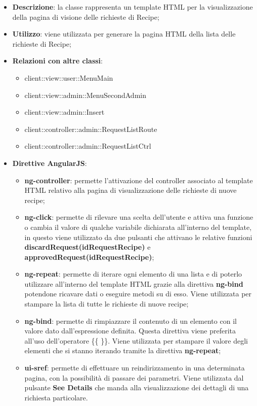 			\begin{itemize}
				\item \textbf{Descrizione}: la classe rappresenta un template HTML per la visualizzazione della pagina di visione delle richieste di Recipe;
				\item \textbf{Utilizzo}: viene utilizzata per generare la pagina HTML della lista delle richieste di Recipe;
				\item \textbf{Relazioni con altre classi}:
					\begin{itemize}
						\item client::view::user::MenuMain
						\item client::view::admin::MenuSecondAdmin
						\item client::view::admin::Insert
						\item client::controller::admin::RequestListRoute
						\item client::controller::admin::RequestListCtrl
					\end{itemize}
				\item \textbf{Direttive AngularJS}:
					\begin{itemize}
						\item \textbf{ng-controller}: permette l'attivazione del controller associato al template HTML relativo alla pagina di visualizzazione delle richieste di nuove recipe;
						\item \textbf{ng-click}: permette di rilevare una scelta dell'utente e attiva una funzione o cambia il valore di qualche variabile dichiarata all'interno del template, in questo viene utilizzato da due pulsanti che attivano le relative funzioni \textbf{discardRequest(idRequestRecipe)} e \textbf{approvedRequest(idRequestRecipe)};
						\item \textbf{ng-repeat}: permette di iterare ogni elemento di una lista e di poterlo utilizzare all'interno del template HTML grazie alla direttiva \textbf{ng-bind} potendone ricavare dati o eseguire metodi su di esso. Viene utilizzata per stampare la lista di tutte le richieste di nuove recipe;
						\item \textbf{ng-bind}: permette di rimpiazzare il contenuto di un elemento con il valore dato dall'espressione definita. Questa direttiva viene preferita all'uso dell'operatore \{\{ \}\}. Viene utilizzata per stampare il valore degli elementi che si stanno iterando tramite la direttiva \textbf{ng-repeat};
						\item \textbf{ui-sref}: permette di effettuare un reindirizzamento in una determinata pagina, con la possibilità di passare dei parametri. Viene utilizzata dal pulsante \textbf{See Details} che manda alla visualizzazione dei dettagli di una richiesta particolare.
					\end{itemize}
			\end{itemize}

